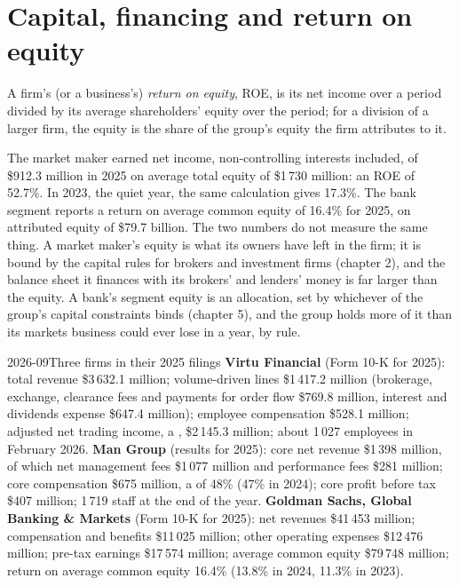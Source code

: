 \section{Capital, financing and return on equity}

\begin{definition}\label{def:fm:the-economics-of-a-trading-firm:roe}
A firm's (or a business's) \emph{return on equity}, ROE, is its net income over a period divided by its average
shareholders' equity over the period; for a division of a larger firm, the equity is the share of the group's equity the firm attributes to it.
\end{definition}

The market maker earned net income, non-controlling interests included, of \$912.3 million in 2025 on average total equity of \$1\,730 million:
an ROE of 52.7\%. In 2023, the quiet year, the same calculation gives 17.3\%. The bank segment reports a return on average common equity of 16.4\%
for 2025, on attributed equity of \$79.7 billion. The two numbers do not measure the same thing. A market maker's equity is what its owners have
left in the firm; it is bound by the capital rules for brokers and investment firms (chapter 2), and the balance sheet it finances with its
brokers' and lenders' money is far larger than the equity. A bank's segment equity is an allocation, set by whichever of the group's capital
constraints binds (chapter 5), and the group holds more of it than its markets business could ever lose in a year, by rule.

\begin{dated}{2026-09}{Three firms in their 2025 filings}\label{dat:fm:the-economics-of-a-trading-firm:three}
\textbf{Virtu Financial} (Form 10-K for 2025): total revenue \$3\,632.1 million; volume-driven lines \$1\,417.2 million (brokerage, exchange,
clearance fees and payments for order flow \$769.8 million, interest and dividends expense \$647.4 million); employee compensation \$528.1 million;
adjusted net trading income, a , \$2\,145.3 million; about 1\,027 employees in February 2026.
\textbf{Man Group} (results for 2025): core net revenue \$1\,398 million, of which net management fees \$1\,077 million and performance fees \$281
million; core compensation \$675 million, a  of 48\% (47\% in 2024); core profit before tax \$407 million; 1\,719 staff at the end
of the year. \textbf{Goldman Sachs, Global Banking \& Markets} (Form 10-K for 2025): net revenues \$41\,453 million; compensation and benefits
\$11\,025 million; other operating expenses \$12\,476 million; pre-tax earnings \$17\,574 million; average common equity \$79\,748 million; return on
average common equity 16.4\% (13.8\% in 2024, 11.3\% in 2023).
\end{dated}

